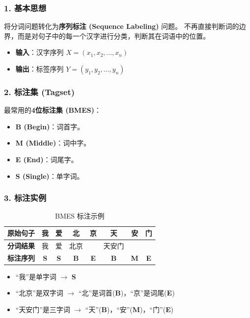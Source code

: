 \documentclass[a4paper, 11pt]{ctexart}
\begin{document}
\subsubsection{1. 基本思想}
将分词问题转化为\textbf{序列标注 (Sequence Labeling)} 问题。
不再直接判断词的边界，而是对句子中的每一个汉字进行分类，判断其在词语中的位置。
\begin{itemize}
    \item \textbf{输入}：汉字序列 $X = (x_1, x_2, \dots, x_n)$
    \item \textbf{输出}：标签序列 $Y = (y_1, y_2, \dots, y_n)$
\end{itemize}

\subsubsection{2. 标注集 (Tagset)}
最常用的\textbf{4位标注集 (BMES)}：
\begin{itemize}
    \item \textbf{B (Begin)}：词首字。
    \item \textbf{M (Middle)}：词中字。
    \item \textbf{E (End)}：词尾字。
    \item \textbf{S (Single)}：单字词。
\end{itemize}

\subsubsection{3. 标注实例}
\begin{table}[h]
    \centering
    \begin{tabular}{l|c|c|c|c|c|c|c}
        \hline
        \textbf{原始句子} & 我 & 爱 & 北 & 京 & 天 & 安 & 门 \\
        \hline
        \textbf{分词结果} & 我 & 爱 & 北京 & & 天安门 & & \\
        \hline
        \textbf{标注序列} & \textbf{S} & \textbf{S} & \textbf{B} & \textbf{E} & \textbf{B} & \textbf{M} & \textbf{E} \\
        \hline
    \end{tabular}
    \caption{BMES 标注示例}
\end{table}

\begin{itemize}
    \item “我”是单字词 $\to$ \textbf{S}
    \item “北京”是双字词 $\to$ “北”是词首(\textbf{B})，“京”是词尾(\textbf{E})
    \item “天安门”是三字词 $\to$ “天”(\textbf{B})，“安”(\textbf{M})，“门”(\textbf{E})
\end{itemize}
\end{document}
